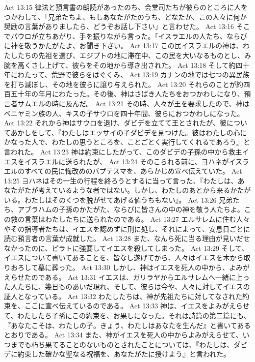 Act 13:15  律法と預言書の朗読があったのち、会堂司たちが彼らのところに人をつかわして、「兄弟たちよ、もしあなたがたのうち、どなたか、この人々に何か奨励の言葉がありましたら、どうぞお話し下さい」と言わせた。
Act 13:16  そこでパウロが立ちあがり、手を振りながら言った。「イスラエルの人たち、ならびに神を敬うかたがたよ、お聞き下さい。
Act 13:17  この民イスラエルの神は、わたしたちの先祖を選び、エジプトの地に滞在中、この民を大いなるものとし、み腕を高くさし上げて、彼らをその地から導き出された。
Act 13:18  そして約四十年にわたって、荒野で彼らをはぐくみ、
Act 13:19  カナンの地では七つの異民族を打ち滅ぼし、その地を彼らに譲り与えられた。
Act 13:20  それらのことが約四百五十年の年月にわたった。その後、神はさばき人たちをおつかわしになり、預言者サムエルの時に及んだ。
Act 13:21  その時、人々が王を要求したので、神はベニヤミン族の人、キスの子サウロを四十年間、彼らにおつかわしになった。
Act 13:22  それから神はサウロを退け、ダビデを立てて王とされたが、彼についてあかしをして、『わたしはエッサイの子ダビデを見つけた。彼はわたしの心にかなった人で、わたしの思うところを、ことごとく実行してくれるであろう』と言われた。
Act 13:23  神は約束にしたがって、このダビデの子孫の中から救主イエスをイスラエルに送られたが、
Act 13:24  そのこられる前に、ヨハネがイスラエルのすべての民に悔改めのバプテスマを、あらかじめ宣べ伝えていた。
Act 13:25  ヨハネはその一生の行程を終ろうとするに当って言った、『わたしは、あなたがたが考えているような者ではない。しかし、わたしのあとから来るかたがいる。わたしはそのくつを脱がせてあげる値うちもない』。
Act 13:26  兄弟たち、アブラハムの子孫のかたがた、ならびに皆さんの中の神を敬う人たちよ。この救の言葉はわたしたちに送られたのである。
Act 13:27  エルサレムに住む人々やその指導者たちは、イエスを認めずに刑に処し、それによって、安息日ごとに読む預言者の言葉が成就した。
Act 13:28  また、なんら死に当る理由が見いだせなかったのに、ピラトに強要してイエスを殺してしまった。
Act 13:29  そして、イエスについて書いてあることを、皆なし遂げてから、人々はイエスを木から取りおろして墓に葬った。
Act 13:30  しかし、神はイエスを死人の中から、よみがえらせたのである。
Act 13:31  イエスは、ガリラヤからエルサレムへ一緒に上った人たちに、幾日ものあいだ現れ、そして、彼らは今や、人々に対してイエスの証人となっている。
Act 13:32  わたしたちは、神が先祖たちに対してなされた約束を、ここに宣べ伝えているのである。
Act 13:33  神は、イエスをよみがえらせて、わたしたち子孫にこの約束を、お果しになった。それは詩篇の第二篇にも、『あなたこそは、わたしの子。きょう、わたしはあなたを生んだ』と書いてあるとおりである。
Act 13:34  また、神がイエスを死人の中からよみがえらせて、いつまでも朽ち果てることのないものとされたことについては、『わたしは、ダビデに約束した確かな聖なる祝福を、あなたがたに授けよう』と言われた。
